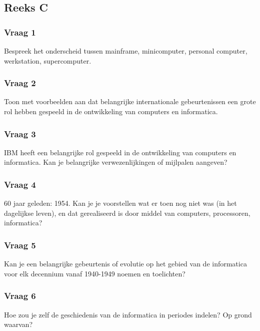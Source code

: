 \documentclass[../main.tex]{subfiles}
\begin{document}
\subsection{Reeks C}
\subsubsection{Vraag 1}
\begin{question}
Bespreek het onderscheid tussen mainframe, minicomputer, personal computer, werkstation, supercomputer.
\end{question}

\subsubsection{Vraag 2}
\begin{question}
Toon met voorbeelden aan dat belangrijke internationale gebeurtenissen een grote rol hebben gespeeld in de ontwikkeling van computers en informatica.
\end{question}

\subsubsection{Vraag 3}
\begin{question}
IBM heeft een belangrijke rol gespeeld in de ontwikkeling van computers en informatica. Kan je belangrijke verwezenlijkingen of mijlpalen aangeven?
\end{question}

\subsubsection{Vraag 4}
\begin{question}
60 jaar geleden: 1954. Kan je je voorstellen wat er toen nog niet was (in het dagelijkse leven), en dat gerealiseerd is door middel van computers, processoren, informatica?
\end{question}

\subsubsection{Vraag 5}
\begin{question}
Kan je een belangrijke gebeurtenis of evolutie op het gebied van de informatica voor elk  decennium vanaf 1940-1949 noemen en toelichten?
\end{question}

\subsubsection{Vraag 6}
\begin{question}
Hoe zou je zelf de geschiedenis van de informatica in periodes indelen? Op grond waarvan?
\end{question}
\end{document}
